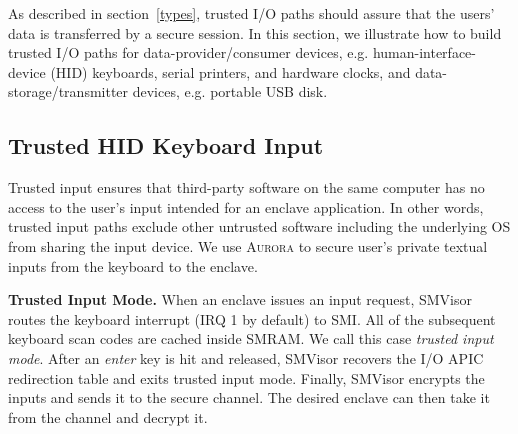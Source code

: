 As described in section~\autoref{types},  trusted I/O paths  should assure that the users' data is transferred by a secure session. 
In this section, we illustrate how to build trusted I/O paths for data-provider/consumer devices, e.g. human-interface-device (HID) keyboards, serial printers, and hardware clocks, and data-storage/transmitter devices, e.g. portable USB disk.

\subsection{Trusted HID Keyboard Input}\label{input_service}
Trusted input ensures that third-party software on the same computer has no access to the user's input intended for an enclave application. In other words, trusted input paths exclude other untrusted software including the underlying OS from sharing the input device. We use \textsc{Aurora} to secure user's private textual inputs from the keyboard to the enclave.%

\textbf{Trusted Input Mode.}
When an enclave issues an input request, SMVisor routes the keyboard interrupt (IRQ 1 by default) to SMI. All of the subsequent keyboard scan codes are cached inside SMRAM. We call this case \emph{trusted input mode}. After an \emph{enter} key is hit and released, SMVisor recovers the I/O APIC redirection table and exits trusted input mode. Finally, SMVisor encrypts the inputs and sends it to the secure channel. The desired enclave can then take it from the channel and decrypt it. %

